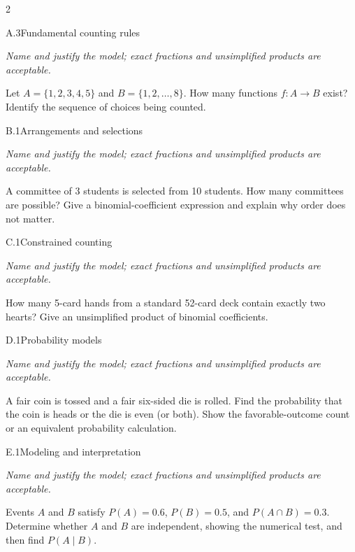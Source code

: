 \documentclass[9pt]{extarticle}
\begin{document}
\CoreWorkArea
\FormBreak
{}
\begin{multicols}{2}
\begin{CoreProblem}{A.3}{Fundamental counting rules}
{\scriptsize\textit{Name and justify the model; exact fractions and unsimplified products are acceptable.}\par}
Let $A=\{1,2,3,4,5\}$ and $B=\{1,2,\ldots,8\}$. How many functions
    $f:A\to B$ exist? Identify the sequence of choices being counted.
\end{CoreProblem}
\begin{CoreProblem}{B.1}{Arrangements and selections}
{\scriptsize\textit{Name and justify the model; exact fractions and unsimplified products are acceptable.}\par}
A committee of 3 students is selected from 10 students. How many
    committees are possible? Give a binomial-coefficient expression and explain
    why order does not matter.
\end{CoreProblem}
\begin{CoreProblem}{C.1}{Constrained counting}
{\scriptsize\textit{Name and justify the model; exact fractions and unsimplified products are acceptable.}\par}
How many 5-card hands from a standard 52-card deck contain exactly
    two hearts? Give an unsimplified product of binomial coefficients.
\end{CoreProblem}
\columnbreak
\begin{CoreProblem}{D.1}{Probability models}
{\scriptsize\textit{Name and justify the model; exact fractions and unsimplified products are acceptable.}\par}
A fair coin is tossed and a fair six-sided die is rolled. Find the
    probability that the coin is heads or the die is even (or both). Show the
    favorable-outcome count or an equivalent probability calculation.
\end{CoreProblem}
\begin{CoreProblem}{E.1}{Modeling and interpretation}
{\scriptsize\textit{Name and justify the model; exact fractions and unsimplified products are acceptable.}\par}
Events $A$ and $B$ satisfy $P(A)=0.6$, $P(B)=0.5$, and
    $P(A\cap B)=0.3$. Determine whether $A$ and $B$ are independent, showing
    the numerical test, and then find $P(A\mid B)$.
\end{CoreProblem}
\end{multicols}
\CoreWorkArea
\FormBreak
{}
\end{document}
